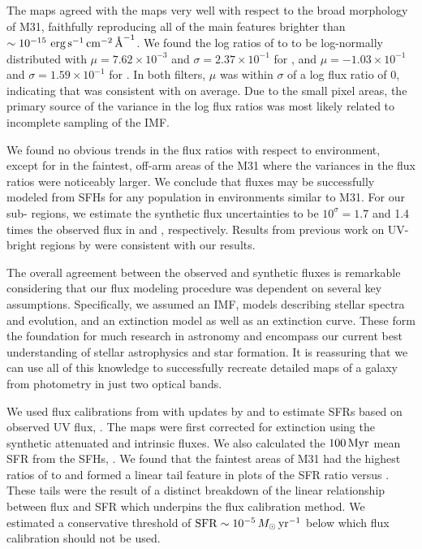 The \fxsfh{} maps agreed with the \fxobs{} maps very well with respect to the
broad morphology of M31, faithfully reproducing all of the main features
brighter than $\sim 10^{-15}\, \,\mathrm{erg}\,\mathrm{s}^{-1}\,\mathrm{cm}^{-2}\,\textrm{\AA}^{-1}$. We found the log ratios of \fxsfh{} to
\fxobs{} to be log-normally distributed with $\mu = 7.62\times 10^{-3}$ and
$\sigma = 2.37\times 10^{-1}$ for \fuv{}, and $\mu = -1.03\times 10^{-1}$ and
$\sigma = 1.59\times 10^{-1}$ for \nuv{}. In both filters, $\mu$ was within
$\sigma$ of a log flux ratio of 0, indicating that \fxsfh{} was consistent with
\fxobs{} on average. Due to the small pixel areas, the primary source of the
variance in the log flux ratios was most likely related to incomplete sampling
of the IMF.

We found no obvious trends in the flux ratios with respect to environment,
except for in the faintest, off-arm areas of the M31 where the variances in the
flux ratios were noticeably larger. We conclude that fluxes may be successfully
modeled from SFHs for any population in environments similar to M31. For our
sub-\kpc{} regions, we estimate the synthetic flux uncertainties to be
$10^\sigma = 1.7$ and 1.4 times the observed flux in \fuv{} and \nuv{},
respectively. Results from previous work on UV-bright regions by
\citet{Simones:2014} were consistent with our results.

The overall agreement between the observed and synthetic fluxes is remarkable
considering that our flux modeling procedure was dependent on several key
assumptions. Specifically, we assumed an IMF, models describing stellar spectra
and evolution, and an extinction model as well as an extinction curve. These
form the foundation for much research in astronomy and encompass our current
best understanding of stellar astrophysics and star formation. It is reassuring
that we can use all of this knowledge to successfully recreate detailed maps of
a galaxy from photometry in just two optical bands.

We used flux calibrations from \citet{Kennicutt:1998} with updates by
\citet{Hao:2011} and \citet{Murphy:2011} to estimate SFRs based on observed UV
flux, \sfrx{}. The \fxobs{} maps were first corrected for extinction using the
synthetic attenuated and intrinsic fluxes. We also calculated the $100\,\mathrm{Myr}$
mean SFR from the SFHs, \sfroneh{}. We found that the faintest areas of M31 had
the highest ratios of \sfrx{} to \sfroneh{} and formed a linear tail feature in
plots of the SFR ratio versus \sfroneh{}. These tails were the result of a
distinct breakdown of the linear relationship between flux and SFR which
underpins the flux calibration method. We estimated a conservative threshold of
$\mathrm{SFR} \sim 10^{-5}\,M_\odot\,\mathrm{yr}^{-1}$ below which flux calibration should not be
used.

